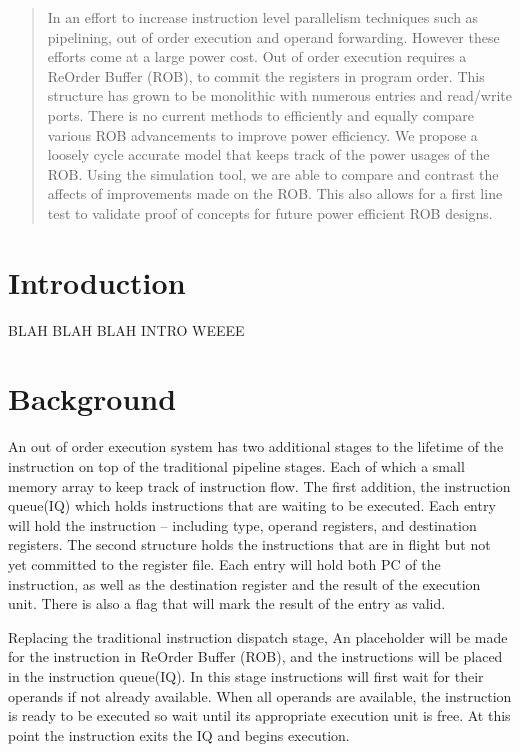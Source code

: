 \documentclass{acm_proc_article-sp}
\begin{document}
\maketitle
\begin{abstract}
	In an effort to increase instruction level parallelism techniques such 
as pipelining, out of order execution and operand forwarding.  However 
these efforts come at a large power cost.  Out of order execution requires
a ReOrder Buffer (ROB), to commit the registers in program order.  This 
structure has grown to be monolithic with numerous entries and read/write ports.
There is no current methods to efficiently and equally compare various
ROB advancements to improve power efficiency. We propose a loosely cycle
accurate model that keeps track of the power usages of the ROB.  Using the 
simulation tool, we are able to compare and contrast the affects of improvements
made on the ROB.  This also allows for a first line test to validate proof of 
concepts for future power efficient ROB designs. 
\end{abstract}



\section{Introduction}
BLAH BLAH BLAH INTRO WEEEE
\section{Background}
    An out of order execution system has two additional stages 
to the lifetime of the instruction on top of the traditional pipeline 
stages.  Each of which a small memory array to keep track of instruction flow.
The first addition, the instruction queue(IQ) which holds instructions that are 
waiting to be executed.  Each entry will hold the instruction -- including 
type, operand registers, and destination registers.  The second structure 
holds the instructions that are in flight but not yet committed to the register
file. Each entry will hold both PC of the instruction, as well as the destination
register and the result of the execution unit.  There is also a flag that will
mark the result of the entry as valid.  

Replacing the traditional instruction dispatch stage, An placeholder will be made for the 
instruction in ReOrder Buffer (ROB), and the instructions will be placed
in the instruction queue(IQ). In this stage instructions will first wait for their operands if not already
available.  When all operands are available, the instruction is ready to 
be executed so wait until its appropriate execution unit is free.  At this 
point the instruction exits the IQ and begins execution.  
\end{document}
